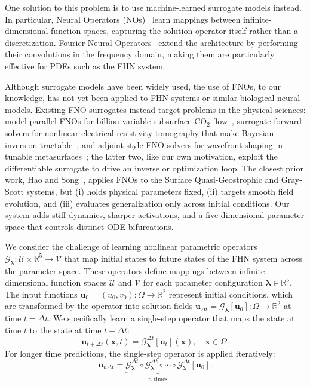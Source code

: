 \documentclass[runningheads]{llncs}
\begin{document}
One solution to this problem is to use machine-learned surrogate models instead. In particular, Neural Operators (NOs)~\cite{kovachki2021neural} learn mappings between infinite-dimensional function spaces, capturing the solution operator itself rather than a discretization. Fourier Neural Operators~\cite{li2021fourierneuraloperatorparametric} extend the architecture by performing their convolutions in the frequency domain, making them are particularly effective for PDEs such as the FHN system.

Although surrogate models have been widely used, the use of FNOs, to our knowledge, has not yet been applied to FHN systems or similar biological neural models. Existing FNO surrogates instead target problems in the physical sciences: model-parallel FNOs for billion-variable subsurface CO$_2$ flow~\cite{grady2023modelparallel}, surrogate forward solvers for nonlinear electrical resistivity tomography that make Bayesian inversion tractable~\cite{ghadjari2026fno}, and adjoint-style FNO solvers for wavefront shaping in tunable metasurfaces~\cite{kang2024adjoint}; the latter two, like our own motivation, exploit the differentiable surrogate to drive an inverse or optimization loop. The closest prior work, Hao and Song~\cite{hao2024fourier}, applies FNOs to the Surface Quasi-Geostrophic and Gray-Scott systems, but (i) holds physical parameters fixed, (ii) targets smooth field evolution, and (iii) evaluates generalization only across initial conditions. Our system adds stiff dynamics, sharper activations, and a five-dimensional parameter space that controls distinct ODE bifurcations.

We consider the challenge of learning nonlinear parametric operators $\mathcal{G}_{\bm{\lambda}}: \mathcal{U} \times \mathbb{R}^5 \rightarrow \mathcal{V}$ that map initial states to future states of the FHN system across the parameter space. These operators define mappings between infinite-dimensional function spaces $\mathcal{U}$ and $\mathcal{V}$ for each parameter configuration $\bm{\lambda} \in \mathbb{R}^5$. The input functions $\bm{u}_0 = (u_0, v_0): \Omega \rightarrow \mathbb{R}^2$ represent initial conditions, which are transformed by the operator into solution fields $\bm{u}_{\Delta t} = \mathcal{G}_{\bm{\lambda}}[\bm{u}_0]: \Omega \rightarrow \mathbb{R}^2$ at time $t = \Delta t$. We specifically learn a single-step operator that maps the state at time $t$ to the state at time $t + \Delta t$:
\begin{equation*}
    \bm{u}_{t+\Delta t}(\bm{x},t) = \mathcal{G}_{\bm{\lambda}}^{\Delta t}[\bm{u}_t](\bm{x}), \quad \bm{x} \in \Omega.
    \label{eq:single_step}
\end{equation*}
\noindent For longer time predictions, the single-step operator is applied iteratively:
\begin{equation*}
    \bm{u}_{n\Delta t} = \underbrace{\mathcal{G}_{\bm{\lambda}}^{\Delta t} \circ \mathcal{G}_{\bm{\lambda}}^{\Delta t} \circ \cdots \circ \mathcal{G}_{\bm{\lambda}}^{\Delta t}}_{n \text{ times}}[\bm{u}_0].
    \label{eq:autoregressive}
\end{equation*}
\end{document}
